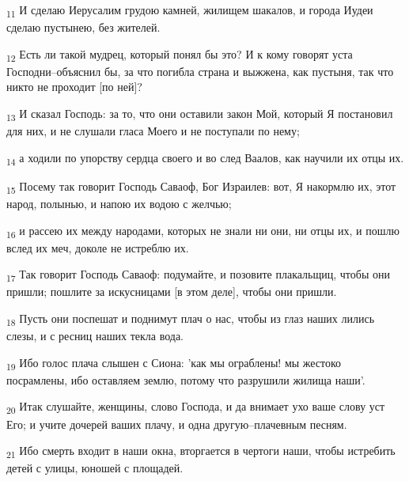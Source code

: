 \begin{tcolorbox}
\textsubscript{11} И сделаю Иерусалим грудою камней, жилищем шакалов, и города Иудеи сделаю пустынею, без жителей.
\end{tcolorbox}
\begin{tcolorbox}
\textsubscript{12} Есть ли такой мудрец, который понял бы это? И к кому говорят уста Господни--объяснил бы, за что погибла страна и выжжена, как пустыня, так что никто не проходит [по ней]?
\end{tcolorbox}
\begin{tcolorbox}
\textsubscript{13} И сказал Господь: за то, что они оставили закон Мой, который Я постановил для них, и не слушали гласа Моего и не поступали по нему;
\end{tcolorbox}
\begin{tcolorbox}
\textsubscript{14} а ходили по упорству сердца своего и во след Ваалов, как научили их отцы их.
\end{tcolorbox}
\begin{tcolorbox}
\textsubscript{15} Посему так говорит Господь Саваоф, Бог Израилев: вот, Я накормлю их, этот народ, полынью, и напою их водою с желчью;
\end{tcolorbox}
\begin{tcolorbox}
\textsubscript{16} и рассею их между народами, которых не знали ни они, ни отцы их, и пошлю вслед их меч, доколе не истреблю их.
\end{tcolorbox}
\begin{tcolorbox}
\textsubscript{17} Так говорит Господь Саваоф: подумайте, и позовите плакальщиц, чтобы они пришли; пошлите за искусницами [в этом деле], чтобы они пришли.
\end{tcolorbox}
\begin{tcolorbox}
\textsubscript{18} Пусть они поспешат и поднимут плач о нас, чтобы из глаз наших лились слезы, и с ресниц наших текла вода.
\end{tcolorbox}
\begin{tcolorbox}
\textsubscript{19} Ибо голос плача слышен с Сиона: 'как мы ограблены! мы жестоко посрамлены, ибо оставляем землю, потому что разрушили жилища наши'.
\end{tcolorbox}
\begin{tcolorbox}
\textsubscript{20} Итак слушайте, женщины, слово Господа, и да внимает ухо ваше слову уст Его; и учите дочерей ваших плачу, и одна другую--плачевным песням.
\end{tcolorbox}
\begin{tcolorbox}
\textsubscript{21} Ибо смерть входит в наши окна, вторгается в чертоги наши, чтобы истребить детей с улицы, юношей с площадей.
\end{tcolorbox}
